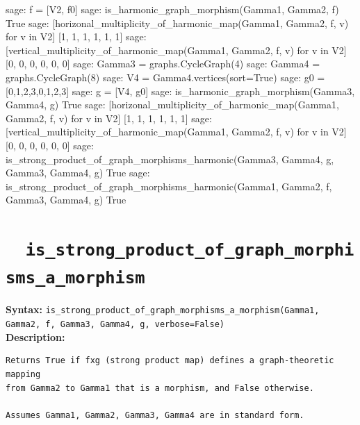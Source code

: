 \documentclass{article}
\begin{document}
\begin{spverbatim}
    sage: f = [V2, f0]                                                                           
    sage: is_harmonic_graph_morphism(Gamma1, Gamma2, f)                                          
    True
    sage: [horizonal_multiplicity_of_harmonic_map(Gamma1, Gamma2, f, v) for v in V2] 
    [1, 1, 1, 1, 1, 1]
    sage: [vertical_multiplicity_of_harmonic_map(Gamma1, Gamma2, f, v) for v in V2]   
    [0, 0, 0, 0, 0, 0]
    sage: Gamma3 = graphs.CycleGraph(4)                                                          
    sage: Gamma4 = graphs.CycleGraph(8)                                                          
    sage: V4 = Gamma4.vertices(sort=True)                                                       
    sage: g0 = [0,1,2,3,0,1,2,3]                                                                 
    sage: g = [V4, g0]                                                                           
    sage: is_harmonic_graph_morphism(Gamma3, Gamma4, g)                                          
    True
    sage: [horizonal_multiplicity_of_harmonic_map(Gamma1, Gamma2, f, v) for v in V2]             
    [1, 1, 1, 1, 1, 1]
    sage: [vertical_multiplicity_of_harmonic_map(Gamma1, Gamma2, f, v) for v in V2]              
    [0, 0, 0, 0, 0, 0]
    sage: is_strong_product_of_graph_morphisms_harmonic(Gamma3, Gamma4, g, Gamma3, Gamma4, g)    
    True
    sage: is_strong_product_of_graph_morphisms_harmonic(Gamma1, Gamma2, f, Gamma3, Gamma4, g)   
    True
\end{spverbatim}

\section{\tt \ \ is\_strong\_product\_of\_graph\_morphisms\_a\_morphism}

\textbf{Syntax:}
\verb}is_strong_product_of_graph_morphisms_a_morphism(Gamma1, Gamma2, f, Gamma3, Gamma4, g, verbose=False)}\\

\textbf{Description:}
\begin{verbatim}
Returns True if fxg (strong product map) defines a graph-theoretic mapping
from Gamma2 to Gamma1 that is a morphism, and False otherwise. 

Assumes Gamma1, Gamma2, Gamma3, Gamma4 are in standard form.
\end{verbatim}
\end{document}
